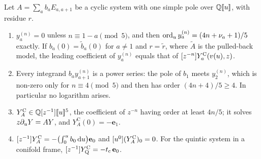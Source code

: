 \begin{lem}
\label{lem:gau-vanq}
Let $A=\sum_ab_aE_{a,a+1}$ be a cyclic system with one simple pole over $\mathbb{Q}[\![ u ]\!]$, with residue $r$.
\begin{enumerate}
\item[(a)] $y^{(n)}_a=0$ unless $n\equiv1-a\pmod5$, and then $\operatorname{ord}_uy^{(n)}_a=(4n+\nu_a+1)/5$ exactly. If $b_a(0)=\tilde b_a(0)$ for $a\neq1$ and $r=\tilde r$, where $\tilde A$ is the pulled-back model, the leading coefficient of $y^{(n)}_a$ equals that of $[z^{-n}]Y^{\mathrm{C}}_a(v(u),z)$.
\item[(b)] Every integrand $b_ay^{(n)}_{a+1}$ is a power series: the pole of $b_1$ meets $y^{(n)}_2$, which is non-zero only for $n\equiv4\pmod5$ and then has order $(4n+4)/5\geq4$. In particular no logarithm arises.
\item[(c)] $Y^{\mathrm C}_A\in\mathbb{Q}[z^{-1}][\![ u ]\!]^5$, the coefficient of $z^{-n}$ having order at least $4n/5$; it solves $z\partial_uY=AY$, and $Y^{\mathrm C}_A(0)=-\mathbf e_1$.
\item[(d)] $[z^{-1}]Y^{\mathrm C}_A=-\bigl(\int_0^ub_0\,\mathrm{d} u\bigr)\mathbf e_0$ and $[u^0](Y^{\mathrm C}_A)_0=0$. For the quintic system in a conifold frame, $[z^{-1}]Y^{\mathrm{C}}_{\mathrm{Q}}=-t_{\mathrm{c}}\,\mathbf e_0$.
\end{enumerate}
\end{lem}

